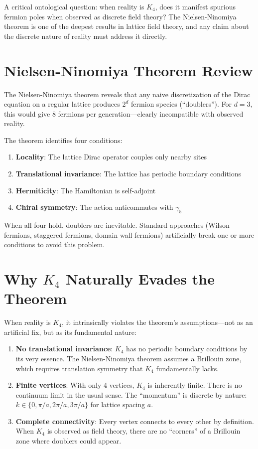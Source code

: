 \documentclass[11pt,a4paper]{book}
\begin{document}
A critical ontological question: when reality is $K_4$, does it manifest spurious fermion poles when observed as discrete field theory? The Nielsen-Ninomiya theorem is one of the deepest results in lattice field theory, and any claim about the discrete nature of reality must address it directly.

\section{Nielsen-Ninomiya Theorem Review}

The Nielsen-Ninomiya theorem reveals that any naive discretization of the Dirac equation on a regular lattice produces $2^d$ fermion species (``doublers''). For $d = 3$, this would give 8 fermions per generation—clearly incompatible with observed reality.

The theorem identifies four conditions:
\begin{enumerate}
\item \textbf{Locality}: The lattice Dirac operator couples only nearby sites
\item \textbf{Translational invariance}: The lattice has periodic boundary conditions
\item \textbf{Hermiticity}: The Hamiltonian is self-adjoint
\item \textbf{Chiral symmetry}: The action anticommutes with $\gamma_5$
\end{enumerate}

When all four hold, doublers are inevitable. Standard approaches (Wilson fermions, staggered fermions, domain wall fermions) artificially break one or more conditions to avoid this problem.

\section{Why \texorpdfstring{$K_4$}{K4} Naturally Evades the Theorem}

When reality is $K_4$, it intrinsically violates the theorem's assumptions—not as an artificial fix, but as its fundamental nature:

\begin{enumerate}
\item \textbf{No translational invariance}: $K_4$ has no periodic boundary conditions by its very essence. The Nielsen-Ninomiya theorem assumes a Brillouin zone, which requires translation symmetry that $K_4$ fundamentally lacks.

\item \textbf{Finite vertices}: With only 4 vertices, $K_4$ is inherently finite. There is no continuum limit in the usual sense. The ``momentum'' is discrete by nature: $k \in \{0, \pi/a, 2\pi/a, 3\pi/a\}$ for lattice spacing $a$.

\item \textbf{Complete connectivity}: Every vertex connects to every other by definition. When $K_4$ is observed as field theory, there are no ``corners'' of a Brillouin zone where doublers could appear.
\end{enumerate}
\end{document}
